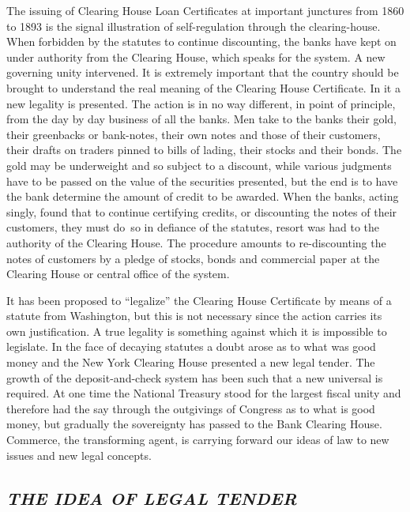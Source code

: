 \documentclass[twoside,symmetric,nobib,justified]{tufte-book}
\begin{document}
The issuing of Clearing House Loan Certificates at important junctures
from 1860 to 1893 is the signal illustration of self-regulation through
the clearing-house. When forbidden by the statutes to continue
discounting, the banks have kept on under authority from the Clearing
House, which speaks for the system. A new governing unity intervened. It
is extremely important that the country should be brought to understand
the real meaning of the Clearing House Certificate. In it a new legality
is presented. The action is in no way different, in point of principle,
from the day by day business of all the banks. Men take to the banks
their gold, their greenbacks or bank-notes, their own notes and those of
their customers, their drafts on traders pinned to bills of lading,
their stocks and their bonds. The gold may be underweight and so subject
to a discount, while various judgments have to be passed on the value of
the securities presented, but the end is to have the bank determine the
amount of credit to be awarded. When the banks, acting singly, found
that to continue certifying credits, or discounting the notes of their
customers, they must do~so in defiance of the statutes, resort was had
to the authority of the Clearing House. The procedure amounts to
re-discounting the notes of customers by a pledge of stocks, bonds and
commercial paper at the Clearing House or central office of the system.~

It has been proposed to ``legalize'' the Clearing House Certificate by
means of a statute from Washington, but this is not necessary since the
action carries its own justification. A true legality is something
against which it is impossible to legislate. In the face of decaying
statutes a doubt arose as to what was good money and the New York
Clearing House presented a new legal tender. The growth of the
deposit-and-check system has been such that a new universal is required.
At one time the National Treasury stood for the largest fiscal unity and
therefore had the say through the outgivings of Congress as to what is
good money, but gradually the sovereignty has passed to the Bank
Clearing House. Commerce, the transforming agent, is carrying forward
our ideas of law to new issues and new legal concepts.~~

\enlargethispage{\baselineskip}

\hypertarget{the-idea-of-legal-tender}{%
\subsection{\texorpdfstring{\emph{THE IDEA OF LEGAL
TENDER}}{THE IDEA OF LEGAL TENDER}}\label{the-idea-of-legal-tender}}
\end{document}
